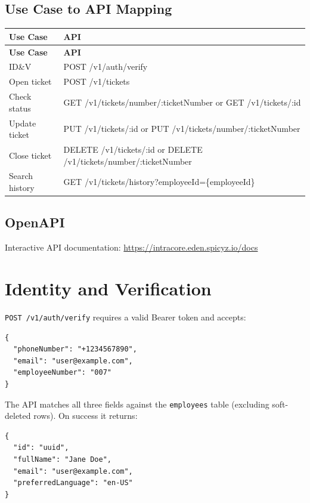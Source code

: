 \documentclass{article}
\begin{document}
\subsection{Use Case to API Mapping}
\begin{longtable}{@{}ll@{}}
\toprule
\textbf{Use Case} & \textbf{API} \\
\midrule
\endfirsthead

\toprule
\textbf{Use Case} & \textbf{API} \\
\midrule
\endhead

ID\&V & POST /v1/auth/verify \\
Open ticket & POST /v1/tickets \\
Check status & GET /v1/tickets/number/:ticketNumber or GET /v1/tickets/:id \\
Update ticket & PUT /v1/tickets/:id or PUT /v1/tickets/number/:ticketNumber \\
Close ticket & DELETE /v1/tickets/:id or DELETE /v1/tickets/number/:ticketNumber \\
Search history & GET /v1/tickets/history?employeeId=\{employeeId\} \\
\bottomrule
\end{longtable}

\subsection{OpenAPI}
Interactive API documentation: \url{https://intracore.eden.spicyz.io/docs}

\clearpage
\section{Identity and Verification}

\texttt{POST /v1/auth/verify} requires a valid Bearer token and accepts:

\begin{lstlisting}
{
  "phoneNumber": "+1234567890",
  "email": "user@example.com",
  "employeeNumber": "007"
}
\end{lstlisting}

The API matches all three fields against the \texttt{employees} table (excluding soft-deleted rows). On success it returns:

\begin{lstlisting}
{
  "id": "uuid",
  "fullName": "Jane Doe",
  "email": "user@example.com",
  "preferredLanguage": "en-US"
}
\end{lstlisting}
\end{document}
